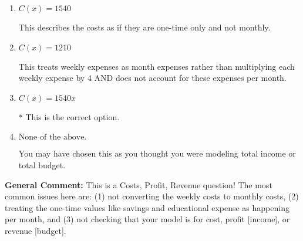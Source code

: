 \documentclass{extbook}[14pt]
\begin{document}
\begin{enumerate}
{\begin{enumerate}[label=\Alph*.]
This treats weekly expenses as monthly expenses rather than multiplying each weekly expense by 4.
\item \( C(x) = 1540 \)

This describes the costs as if they are one-time only and not monthly.
\item \( C(x) = 1210 \)

This treats weekly expenses as month expenses rather than multiplying each weekly expense by 4 AND does not account for these expenses per month.
\item \( C(x) = 1540 x \)

* This is the correct option.
\item \( \text{None of the above.} \)

You may have chosen this as you thought you were modeling total income or total budget.
\end{enumerate}

\textbf{General Comment:} This is a Costs, Profit, Revenue question! The most common issues here are: (1) not converting the weekly costs to monthly costs, (2) treating the one-time values like savings and educational expense as happening per month, and (3) not checking that your model is for cost, profit [income], or revenue [budget].
}
\end{enumerate}
\end{document}
